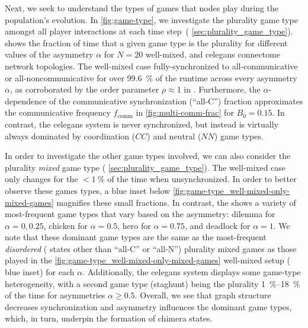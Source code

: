 \documentclass[pdflatex,twocolumn,sn-nature,super]{sn-jnl}
\begin{document}
Next, we seek to understand the types of games
that nodes play during the population's evolution.
In \cref{fig:game-type}, we investigate the plurality game type
amongst all player interactions at each time step~(\cf{} \cref{sec:plurality_game_type}).
 shows the fraction of time
that a given game type is the plurality for different values
of the asymmetry $\alpha$ for
$N=20$ well-mixed,
and
\gls{celegans} connectome
network topologies.
The  well-mixed case
fully-synchronized to all-communicative or all-noncommunicative
for over \SI{99.6}{\percent} of the runtime
across every asymmetry $\alpha$,
as corroborated by the order parameter $\rho \approx 1$ in
.
Furthermore,
the $\alpha$-dependence of the
communicative synchronization (``all-C'') fraction
approximates the communicative frequency $f_{\text{comm}}$
in \cref{fig:multi-comm-frac} for $B_0=0.15$.
In contrast, the
 \gls{celegans} system
is never synchronized, but instead is virtually always dominated by
coordination ($CC$) and neutral ($NN$) game types.

In order to investigate the other game types involved,
we can also consider the plurality \emph{mixed} game type
(\cf{} \cref{sec:plurality_game_type}).
The  well-mixed case
only changes for the $< \SI{1}{\percent}$ of the time when unsynchronized.
In order to better observe these games types,
a blue inset below \cref{fig:game-type_well-mixed-only-mixed-games}
magnifies these small fractions.
In contrast, the 
shows a variety of most-frequent game types
that vary based on the asymmetry:
dilemma for $\alpha = 0, 0.25$, chicken for $\alpha = 0.5$,
hero for $\alpha = 0.75$, and deadlock for $\alpha = 1$.
We note that these dominant game types
are the same as the most-frequent \emph{disordered}
(\ie{} states other than ``all-C'' or ``all-N'')
plurality mixed games as those played in
the \cref{fig:game-type_well-mixed-only-mixed-games}
well-mixed setup (\cf{} blue inset) for each $\alpha$.
Additionally, the \gls{celegans} system displays
some game-type heterogeneity, with
a second game type (staghunt) being the plurality
\SIrange{1}{18}{\percent} of the time
for asymmetries $\alpha \ge 0.5$.
Overall, we see that graph structure decreases synchronization
and asymmetry influences the dominant game types, which, in turn,
underpin the formation of chimera states.
\end{document}
